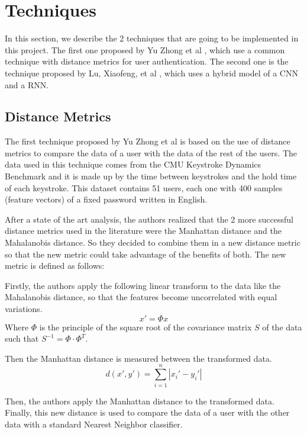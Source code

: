 \section{Techniques}

In this section, we describe the 2 techniques that are going to be implemented in this project. The first one proposed by Yu Zhong et al \cite{combine_distance}, which use a common technique with distance metrics for user authentication. The second one is the technique proposed by Lu, Xiaofeng, et al \cite{deep_learning}, which uses a hybrid model of a CNN and a RNN.

\subsection{Distance Metrics}

The first technique proposed by Yu Zhong et al \cite{combine_distance} is based on the use of distance metrics to compare the data of a user with the data of the rest of the users. The data used in this technique comes from the CMU Keystroke Dynamics Benchmark and it is made up by the time between keystrokes and the hold time of each keystroke. This dataset contains 51 users, each one with 400 samples (feature vectors) of a fixed password written in English.

After a state of the art analysis, the authors realized that the 2 more successful distance metrics used in the literature were the Manhattan distance and the Mahalanobis distance. So they decided to combine them in a new distance metric so that the new metric could take advantage of the benefits of both. The new metric is defined as follows:

Firstly, the authors apply the following linear transform to the data like the Mahalanobis distance, so that the features become uncorrelated with equal variations.
\begin{equation}
	x' = \Phi x
\end{equation}
Where $\Phi$ is the principle of the square root of the covariance matrix $S$ of the data such that $S^{-1} = \Phi \cdot \Phi^T$.

Then the Manhattan distance is measured between the transformed data.
\begin{equation}
	d(x',y') = \sum_{i=1}^{n} |x_i' - y_i'|
\end{equation}

Then, the authors apply the Manhattan distance to the transformed data. Finally, this new distance is used to compare the data of a user with the other data with a standard Nearest Neighbor classifier.

